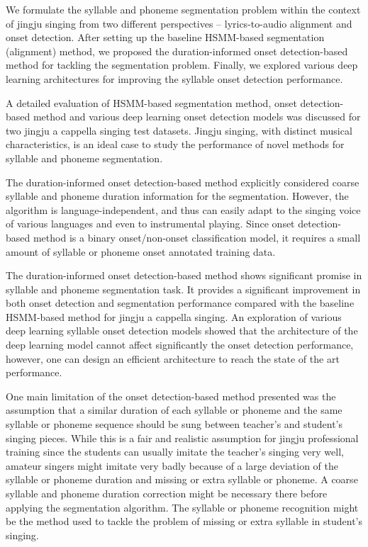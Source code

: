 We formulate the syllable and phoneme segmentation problem within the context of jingju singing from two different perspectives -- lyrics-to-audio alignment and onset detection. After setting up the baseline HSMM-based segmentation (alignment) method, we proposed the duration-informed onset detection-based method for tackling the segmentation problem. Finally, we explored various deep learning architectures for improving the syllable onset detection performance.

A detailed evaluation of HSMM-based segmentation method, onset detection-based method and various deep learning onset detection models was discussed for two jingju a cappella singing test datasets. Jingju singing, with distinct musical characteristics, is an ideal case to study the performance of novel methods for syllable and phoneme segmentation.

The duration-informed onset detection-based method explicitly considered coarse syllable and phoneme duration information for the segmentation. However, the algorithm is language-independent, and thus can easily adapt to the singing voice of various languages and even to instrumental playing. Since onset detection-based method is a binary onset/non-onset classification model, it requires a small amount of syllable or phoneme onset annotated training data.

The duration-informed onset detection-based method shows significant promise in syllable and phoneme segmentation task. It provides a significant improvement in both onset detection and segmentation performance compared with the baseline HSMM-based method for jingju a cappella singing. An exploration of various deep learning syllable onset detection models showed that the architecture of the deep learning model cannot affect significantly the onset detection performance, however, one can design an efficient architecture to reach the state of the art performance.

One main limitation of the onset detection-based method presented was the assumption that a similar duration of each syllable or phoneme and the same syllable or phoneme sequence should be sung between teacher's and student's singing pieces. While this is a fair and realistic assumption for jingju professional training since the students can usually imitate the teacher's singing very well, amateur singers might imitate very badly because of a large deviation of the syllable or phoneme duration and missing or extra syllable or phoneme. A coarse syllable and phoneme duration correction might be necessary there before applying the segmentation algorithm. The syllable or phoneme recognition might be the method used to tackle the problem of missing or extra syllable in student's singing.

